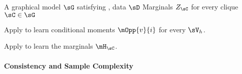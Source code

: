 \renewcommand{\algorithmicrequire}{\textbf{Input:}}
\renewcommand{\algorithmicensure}{\textbf{Output:}}
\begin{algorithm}
  \caption{\LearnMarginals}
  \label{algo:directed}
  \begin{algorithmic}
    \REQUIRE A graphical model $\sG$ satisfying , data $\sD$
    \ENSURE Marginals $Z_\sC$ for every clique $\sC \in \sG$

        \STATE Apply \TensorFactorize to learn conditional moments
        $\mOpp{v}{i}$ for every $\sV_h$.

      \ENDFOR
  \STATE Apply \LearnClique to learn the marginals $\mH_\sC$.
\ENDFOR
  \end{algorithmic}
\end{algorithm}

\paragraph{Consistency and Sample Complexity}

